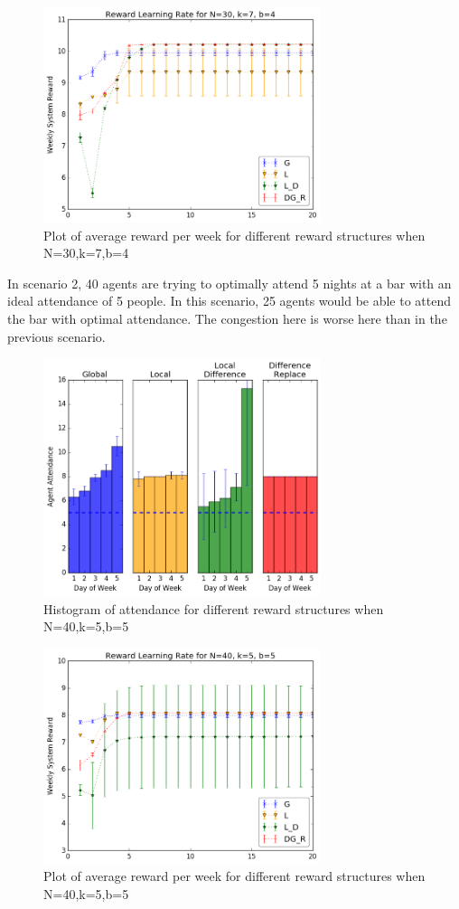 \documentclass[letterpaper, 10 pt, conference]{ieeeconf}
\begin{document}
\begin{figure}
    \centering
    \includegraphics[width=230pt]{Scatter0.png}
    \caption{Plot of average reward per week for different reward structures when N=30,k=7,b=4}
    \label{fig:scenario1_scatter}
\end{figure}



In scenario 2, 40 agents are trying to optimally attend 5 nights at a bar with an ideal attendance of 5 people.  In this scenario, 25 agents would be able to attend the bar with optimal attendance.  The congestion here is worse here than in the previous scenario.
\begin{figure}
    \centering
    \includegraphics[width=230pt]{Histograms1.png}
    \caption{Histogram of attendance for different reward structures when N=40,k=5,b=5}
    \label{fig:Scenario2_hist}
\end{figure}

\begin{figure}
    \centering
    \includegraphics[width=230pt]{Scatter1.png}
    \caption{Plot of average reward per week for different reward structures when N=40,k=5,b=5}
    \label{fig:scenario2_scatter}
\end{figure}
\end{document}
